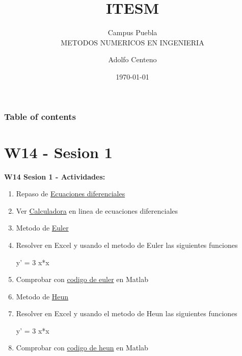\documentclass{beamer}
\begin{document}
\title{ITESM}  
\subtitle{Campus Puebla\\METODOS NUMERICOS EN INGENIERIA
}
\author{Adolfo Centeno}
\date{\today} 


\begin{frame}
\titlepage
\end{frame}

\begin{frame}\frametitle{Table of contents}
\tableofcontents
\end{frame} 


\section{W14 - Sesion 1 }

\begin{frame}

\textbf{W14 Sesion 1 - Actividades:}

\begin{enumerate}

\item
	Repaso de \href{https://www.youtube.com/watch?v=rd2jKGQJucE}{Ecuaciones diferenciales}

\item
    Ver \href{https://es.symbolab.com/solver/ordinary-differential-equation-calculator}{Calculadora} en linea de ecuaciones diferenciales

\item
	Metodo de \href{https://www.youtube.com/watch?v=V6wLYLvqZ84}{Euler}

\item Resolver en Excel y usando el metodo de Euler las siguientes funciones

y' =  3 x*x

	
\item Comprobar con \href{https://github.com/adsoftsito/metodos-numericos/blob/master/w14/euler.m}{codigo de euler} en Matlab

\item
	Metodo de \href{https://www.youtube.com/watch?v=mE11yv_zQKE}{Heun}

\item Resolver en Excel y usando el metodo de Heun las siguientes funciones

y'  =  3 x*x 


\item Comprobar con \href{https://github.com/adsoftsito/metodos-numericos/blob/master/w14/heun.m}{codigo de heun} en Matlab



\end{enumerate} 

\end{frame}
\end{document}
